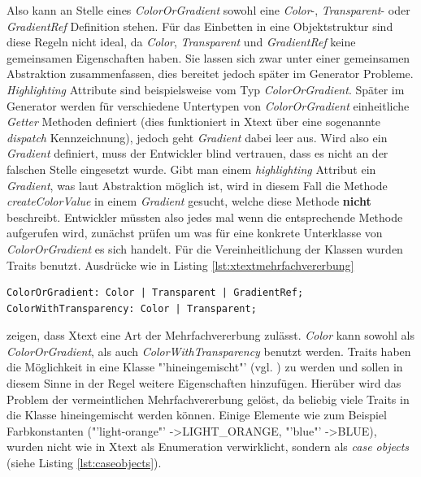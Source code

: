 Also kann an Stelle eines \textit{ColorOrGradient} sowohl eine \textit{Color}-, \textit{Transparent}- oder \textit{GradientRef} Definition stehen. Für das Einbetten in eine Objektstruktur sind diese Regeln nicht ideal, da \textit{Color}, \textit{Transparent} und \textit{GradientRef} keine gemeinsamen Eigenschaften haben. Sie lassen sich zwar unter einer gemeinsamen Abstraktion zusammenfassen, dies bereitet jedoch später im Generator Probleme. \textit{Highlighting} Attribute sind beispielsweise vom Typ \textit{ColorOrGradient}. Später im Generator werden für verschiedene Untertypen von \textit{ColorOrGradient} einheitliche \textit{Getter} Methoden definiert (dies funktioniert in Xtext über eine sogenannte \textit{dispatch} Kennzeichnung), jedoch geht \textit{Gradient} dabei leer aus. Wird also ein \textit{Gradient} definiert, muss der Entwickler blind vertrauen, dass es nicht an der falschen Stelle eingesetzt wurde. Gibt man einem \textit{highlighting} Attribut ein \textit{Gradient}, was laut Abstraktion möglich ist, wird in diesem Fall die Methode \textit{createColorValue} in einem \textit{Gradient} gesucht, welche diese Methode \textbf{nicht} beschreibt. Entwickler müssten also jedes mal wenn die entsprechende Methode aufgerufen wird, zunächst prüfen um was für eine konkrete Unterklasse von \textit{ColorOrGradient} es sich handelt.
Für die Vereinheitlichung der Klassen wurden Traits benutzt. Ausdrücke wie in Listing \ref{lst:xtextmehrfachvererbung}
\begin{lstlisting}[style=spray, caption = {Auszug aus der Style.xtext Grammatik, Color kann als ColorOrGradient oder als ColorWithTransparency benutzt werden}, label = {lst:xtextmehrfachvererbung}]
ColorOrGradient: Color | Transparent | GradientRef;
ColorWithTransparency: Color | Transparent;
\end{lstlisting}zeigen, dass Xtext eine Art der Mehrfachvererbung zulässt. \textit{Color} kann sowohl als \textit{ColorOrGradient}, als auch \textit{ColorWithTransparency} benutzt werden.
Traits haben die Möglichkeit in eine Klasse "'hineingemischt"' (vgl. ) zu werden und sollen in diesem Sinne in der Regel weitere Eigenschaften hinzufügen. Hierüber wird das Problem der vermeintlichen Mehrfachvererbung gelöst, da beliebig viele Traits in die Klasse hineingemischt werden können.
Einige Elemente wie zum Beispiel Farbkonstanten ("'light-orange"' -\textgreater LIGHT\_ORANGE, "'blue"' -\textgreater BLUE), wurden nicht wie in Xtext als Enumeration verwirklicht, sondern als \textit{case objects} (siehe Listing \ref{lst:caseobjects}).
